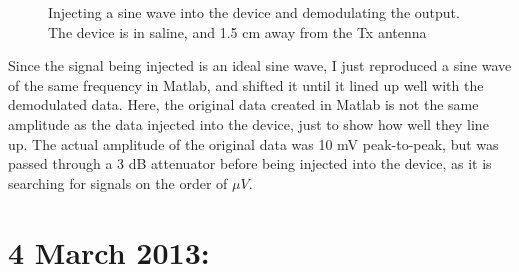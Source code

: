 \documentclass[12pt,onecolumn,titlepage]{article}
\begin{document}
\begin{figure}[htbp]
	\centering
		\quad
	\label{fig:sine500Hz_1p5cm_saline_demod}
	\caption{Injecting a sine wave into the device and demodulating the output. The device is in saline, and 1.5 cm away from the Tx antenna}
\end{figure}

Since the signal being injected is an ideal sine wave, I just reproduced a sine wave of the same frequency in Matlab, and shifted it until it lined up well with the demodulated data. Here, the original data created in Matlab is not the same amplitude as the data injected into the device, just to show how well they line up. The actual amplitude of the original data was 10 mV peak-to-peak, but was passed through a 3 dB attenuator before being injected into the device, as it is searching for signals on the order of $\mu V$.


\clearpage
\section{4 March 2013:}
\end{document}
